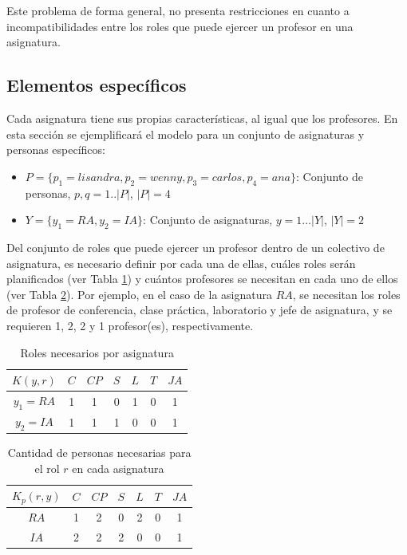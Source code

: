 
Este problema de forma general, no presenta restricciones en cuanto a incompatibilidades entre los roles que puede ejercer un profesor en una asignatura.


\subsection{Elementos específicos}

Cada asignatura tiene sus propias características, al igual que los profesores. En esta sección se ejemplificará el modelo para un conjunto de asignaturas y personas específicos:
\begin{itemize}
	\item $P=\{p_1=lisandra, p_2=wenny, p_3=carlos, p_4=ana\}$: Conjunto de personas, $p, q= 1.. |P|$, $|P|=4$
	
	\item $Y=\{y_1=RA,y_2=IA\}$: Conjunto de asignaturas, $y = 1\ldots |Y|$, $|Y|=2$
\end{itemize}

Del conjunto de roles que puede ejercer un profesor dentro de un colectivo de asignatura, es necesario definir por cada una de ellas, cuáles roles serán planificados (ver Tabla \ref{cpr-carga}) y cuántos profesores se necesitan en cada uno de ellos (ver Tabla \ref{cpnr-carga}). Por ejemplo, en el caso de la asignatura $RA$, se necesitan los roles de profesor de conferencia, clase práctica, laboratorio y jefe de asignatura, y se requieren 1, 2, 2 y 1 profesor(es), respectivamente.
\begin{table}[H]
	\centering
	\caption{Roles necesarios por asignatura}\label{cpr-carga}
	\begin{tabular}{|c|c|c|c|c|c|c|}
		\hline
		$K(y,r)$ & $C$ & $CP$& $S$ & $L$ & $T$ & $JA$ \\ \hline
		$y_1=RA$  	 &  1  &  1  &  0  &  1  &  0 &  1\\ \hline
		$y_2=IA$ 	 &  1  &  1  &  1  &  0  &  0 &  1\\ \hline
	\end{tabular}
\end{table}

\begin{table}[H]
	\centering
	\caption{Cantidad de personas necesarias para el rol $r$ en cada asignatura}\label{cpnr-carga}
	\begin{tabular}{|c|c|c|c|c|c|c|}
		\hline
		$K_{p}(r, y)$ & $C$ & $CP$& $S$& $L$& $T$ & $JA$ \\ \hline
		$RA$       &  1  &  2  &  0 &  2 &  0 &  1  \\ \hline
		$IA$       &  2  &  2  &  2 &  0 &  0  & 1 \\ \hline
	\end{tabular}
\end{table}

